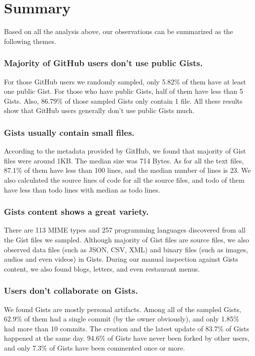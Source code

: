 \section{Summary}

Based on all the analysis above, our observations can be summarized as the following themes.

\subsubsection{Majority of GitHub users don't use public Gists.}

For those GitHub users we randomly sampled, only 5.82\% of them have at least one public Gist. For those who have public Gists, half of them have less than 5 Gists. Also, 86.79\% of those sampled Gists only contain 1 file. All these results show that GitHub users generally don't use public Gists much. 

\subsubsection{Gists usually contain small files.}

According to the metadata provided by GitHub, we found that majority of Gist files were around 1KB. The median size was 714 Bytes. As for all the text files, 87.1\% of them have less than 100 lines, and the median number of lines is 23. We also calculated the source lines of code for all the source files, and todo of them have less than todo lines with median as todo lines. 

\subsubsection{Gists content shows a great variety.}

There are 113 MIME types and 257 programming languages discovered from all the Gist files we sampled. Although majority of Gist files are source files, we also observed data files (such as JSON, CSV, XML) and binary files (such as images, audios and even videos) in Gists. During our manual inspection against Gists content, we also found blogs, letters, and even restaurant menus. 

\subsubsection{Users don't collaborate on Gists.}
We found Gists are mostly personal artifacts. Among all of the sampled Gists, 62.9\% of them had a single commit (by the owner obviously), and only 1.85\% had more than 10 commits. The creation and the latest update of 83.7\% of Gists happened at the same day. 94.6\% of Gists have never been forked by other users, and only 7.3\% of Gists have been commented once or more. 

